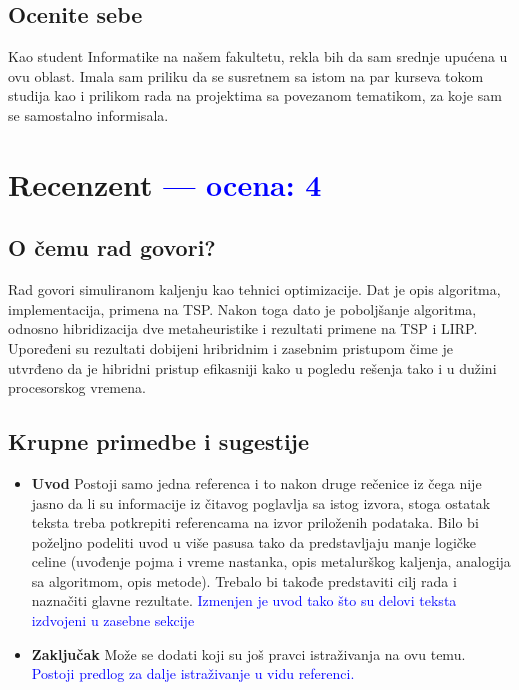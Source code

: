\documentclass[a4paper]{report}
\newcommand{\odgovor}[1]{\textcolor{blue}{#1}}
\begin{document}
\section{Ocenite sebe}
Kao student Informatike na našem fakultetu, rekla bih da sam srednje upućena u ovu oblast. Imala sam priliku da se susretnem sa istom na par kurseva tokom studija kao i prilikom rada na projektima sa povezanom tematikom, za koje sam se samostalno informisala. 

\chapter{Recenzent \odgovor{--- ocena: 4} }


\section{O čemu rad govori?}
Rad govori simuliranom kaljenju kao tehnici optimizacije. Dat je opis algoritma, implementacija, primena na TSP. Nakon toga dato je poboljšanje algoritma, odnosno hibridizacija dve metaheuristike i rezultati primene na TSP i LIRP. Upoređeni su rezultati dobijeni hribridnim i zasebnim pristupom čime je utvrđeno da je hibridni pristup efikasniji kako u pogledu rešenja tako i u dužini procesorskog vremena.


\section{Krupne primedbe i sugestije}
\begin{itemize}
	\item \textbf{Uvod}\newline
	Postoji samo jedna referenca i to nakon druge rečenice iz čega nije jasno da li su informacije iz čitavog poglavlja sa istog izvora, stoga ostatak teksta treba potkrepiti referencama na izvor priloženih podataka. Bilo bi poželjno podeliti uvod u više pasusa tako da predstavljaju manje logičke celine (uvođenje pojma i vreme nastanka, opis metalurškog kaljenja, analogija sa algoritmom, opis metode). Trebalo bi takođe predstaviti cilj rada i naznačiti glavne rezultate.
	\odgovor {Izmenjen je uvod tako što su delovi teksta izdvojeni u zasebne sekcije}
	\item \textbf{Zaključak}\newline
	Može se dodati koji su još pravci istraživanja na ovu temu.
	\odgovor {Postoji predlog za dalje istraživanje u vidu referenci.}
\end{itemize}
\end{document}
